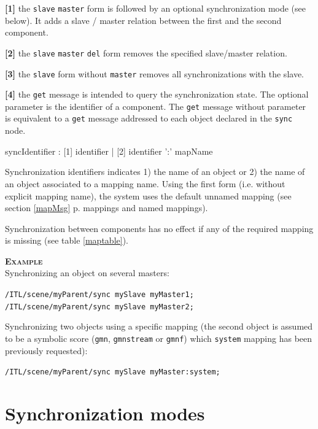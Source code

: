 \documentclass[a4paper,twoside]{report}
\newcommand{\sublevel}[1]	{\section{#1}}
\newcommand{\fullref}[1]	{\ref{#1} p.\pageref{#1}}
\newcommand{\OSC}[1]		{\texttt{#1}}
\newcommand{\example}		{\textbf{\hspace{-1.5cm}\textbf{\textsc{Example }}}}
\let\olditemize\itemize
\let\oldenditemize\enditemize
\renewenvironment{itemize} 	{\olditemize \setlength{\itemsep}{1mm}}{\oldenditemize}
\newcommand{\sample}	[1]			{\vspace{-2mm}\begin{center}\colorbox{mygrey}{
								\begin{minipage}[t]{0.9\columnwidth} 
								{\small \texttt{#1}}
								\end{minipage}}\end{center}}
\begin{document}
\begin{itemize}
\item \textbf{[1]} the \OSC{slave} \OSC{master} form is followed by an optional synchronization mode (see below). It adds a slave / master relation between the first and the second component.
\item \textbf{[2]} the \OSC{slave} \OSC{master} \OSC{del} form removes the specified slave/master relation.
\item \textbf{[3]} the \OSC{slave} form without \OSC{master} removes all synchronizations with the slave.
\item \textbf{[4]} the \OSC{get} message is intended to query the synchronization state. The optional parameter is the identifier of a component. The \OSC{get} message without parameter is equivalent to a \OSC{get} message addressed to each object declared in the \OSC{sync} node.
\end{itemize}

\begin{rail}
syncIdentifier : [1] identifier 
		| [2] identifier ':' mapName
\end{rail}

Synchronization identifiers indicates 1) the name of an object or 2) the name of an object associated to a mapping name. Using the first form (i.e. without explicit mapping name), the system uses the default unnamed mapping (see section \fullref{mapMsg} mappings and named mappings).

Synchronization between components has no effect if any of the required mapping is missing (see table \ref{maptable}).

\example \\
Synchronizing an object on several masters:
\sample{/ITL/scene/myParent/sync mySlave myMaster1;\\
/ITL/scene/myParent/sync mySlave myMaster2;}

Synchronizing two objects using a specific mapping (the second object is assumed to be a symbolic score (\OSC{gmn}, \OSC{gmnstream} or \OSC{gmnf}) which \OSC{system} mapping has been previously requested):
\sample{/ITL/scene/myParent/sync mySlave myMaster:system;}

\sublevel{Synchronization modes}\label{syncmode}
\end{document}
